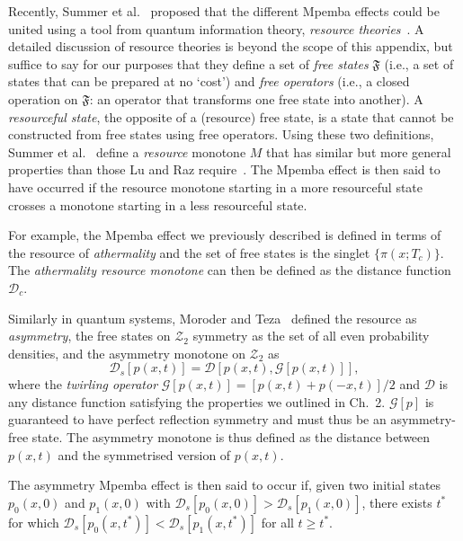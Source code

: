 \documentclass[hyperref={colorlinks=true, urlcolor=blue, citecolor=blue, final, bound}]{sfuthesis}
\begin{document}
\begin{appendices}
Recently, Summer et al.~\cite{Summer2025} proposed that the different Mpemba effects could be united using a tool from quantum information theory, \textit{resource theories}~\cite{Chitambar2019}. A detailed discussion of resource theories is beyond the scope of this appendix, but suffice to say for our purposes that they define a set of \textit{free states} $\mathfrak F$ (i.e., a set of states that can be prepared at no `cost') and \textit{free operators} (i.e., a closed operation on $\mathfrak F$: an operator that transforms one free state into another). A \textit{resourceful state}, the opposite of a (resource) free state, is a state that cannot be constructed from free states using free operators. Using these two definitions, Summer et al.~\cite{Summer2025} define a \textit{resource} monotone $M$ that has similar but more general properties than those Lu and Raz require~\cite{Lu2017}. The Mpemba effect is then said to have occurred if the resource monotone starting in a more resourceful state crosses a monotone starting in a less resourceful state.

For example, the Mpemba effect we previously described is defined in terms of the resource of \textit{athermality} and the set of free states is the singlet $\{\pi(x;T_c)\}$. The \textit{athermality resource monotone} can then be defined as the distance function $\mathcal D_c$. 

Similarly in quantum systems, Moroder and Teza~\cite{Moroder} defined the resource as \textit{asymmetry}, the free states on $\mathcal Z_2$ symmetry as the set of all even probability densities, and the asymmetry monotone on $\mathcal Z_2$ as 
\begin{equation}
    \mathcal D_s[p(x,t)] = \mathscr D[p(x,t),\mathcal G[p(x,t)]],
\end{equation}
where the \textit{twirling operator} $\mathcal G[p(x,t)]=[p(x,t)+p(-x,t)]/2$ and $\mathscr D$ is any distance function satisfying the properties we outlined in Ch.~2. $\mathcal G[p]$ is guaranteed to have perfect reflection symmetry and must thus be an asymmetry-free state. The asymmetry monotone is thus defined as the distance between $p(x,t)$ and the symmetrised version of $p(x,t)$.

The asymmetry Mpemba effect is then said to occur if, given two initial states $p_0(x,0)$ and $p_1(x,0)$ with $\mathcal D_s[p_0(x,0)] > \mathcal D_s[p_1(x,0)]$, there exists $t^*$ for which $\mathcal D_s[p_0(x,t^*)]<\mathcal D_s[p_1(x,t^*)]$ for all $t\geq t^*$.


\end{appendices}
\end{document}
